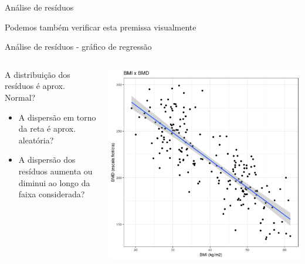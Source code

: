 \documentclass{beamer}
\begin{document}
\begin{frame}{\scriptsize Análise de resíduos}
  \begin{center}
    \Large
    Podemos também verificar esta premissa visualmente
  \end{center}
\end{frame}

\begin{frame}{\scriptsize Análise de resíduos - gráfico de regressão}
  \begin{columns}
    \begin{column}{5cm}
      A distribuição dos resíduos é aprox. Normal?
      \bigskip
      \begin{itemize}
        \footnotesize
      \item A dispersão em torno da reta é aprox. aleatória?
        \bigskip
      \item A dispersão dos resíduos aumenta ou diminui ao longo da faixa considerada?
      \end{itemize}
    \end{column}
    \begin{column}{5cm}
      \begin{center}
        \includegraphics[width=1.1\textwidth]{Cap18-19/pratica-rls2}
      \end{center}
    \end{column}
  \end{columns}
\end{frame}
\end{document}
